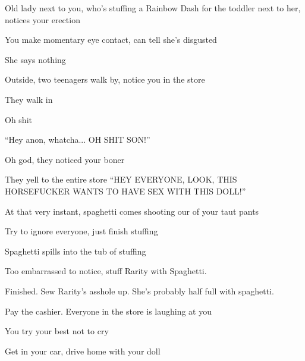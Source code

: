 \documentclass[a1paper]{article}
\begin{document}
\begin{multicols}{7}
{\textrangle \hspace{0.1em} Old lady next to you, who's stuffing a Rainbow Dash for the toddler next to her, notices your erection

\textrangle \hspace{0.1em} You make momentary eye contact, can tell she's disgusted

\textrangle \hspace{0.1em} She says nothing

\textrangle \hspace{0.1em} Outside, two teenagers walk by, notice you in the store

\textrangle \hspace{0.1em} They walk in

\textrangle \hspace{0.1em} Oh shit

\textrangle \hspace{0.1em} ``Hey anon, whatcha... OH SHIT SON!''

\textrangle \hspace{0.1em} Oh god, they noticed your boner

\textrangle \hspace{0.1em} They yell to the entire store ``HEY EVERYONE, LOOK, THIS HORSEFUCKER WANTS TO HAVE SEX WITH THIS DOLL!''

\textrangle \hspace{0.1em} At that very instant, spaghetti comes shooting our of your taut pants

\textrangle \hspace{0.1em} Try to ignore everyone, just finish stuffing

\textrangle \hspace{0.1em} Spaghetti spills into the tub of stuffing

\textrangle \hspace{0.1em} Too embarrassed to notice, stuff Rarity with Spaghetti.

\textrangle \hspace{0.1em} Finished. Sew Rarity's asshole up. She's probably half full with spaghetti.

\textrangle \hspace{0.1em} Pay the cashier. Everyone in the store is laughing at you

\textrangle \hspace{0.1em} You try your best not to cry

\textrangle \hspace{0.1em} Get in your car, drive home with your doll

}
\end{multicols}
\end{document}
